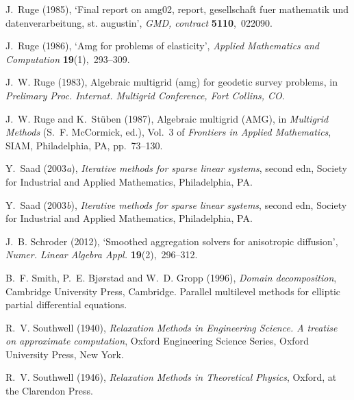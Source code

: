 \documentclass[12pt]{acta_2011xz}
\begin{document}
\begin{thebibliography}{xx}
J.~Ruge  (1985), `Final report on amg02, report, gesellschaft fuer mathematik
  und datenverarbeitung, st. augustin', {\em GMD, contract} {\bf 5110},~022090.

J.~Ruge  (1986), `Amg for problems of elasticity', {\em Applied Mathematics and
  Computation} {\bf 19}(1),~293--309.

J.~W. Ruge  (1983), Algebraic multigrid (amg) for geodetic survey problems, in
  {\em Prelimary Proc. Internat. Multigrid Conference, Fort Collins, CO}.

J.~W. Ruge and K.~St{\"{u}}ben  (1987), Algebraic multigrid ({AMG}), in {\em
  Multigrid Methods} (S.~F. McCormick, ed.), Vol.~3 of {\em Frontiers in
  Applied Mathematics}, SIAM, Philadelphia, PA, pp.~73--130.

Y.~Saad  (2003{\em a}), {\em Iterative methods for sparse linear systems},
  second edn, Society for Industrial and Applied Mathematics, Philadelphia, PA.

Y.~Saad  (2003{\em b}), {\em Iterative methods for sparse linear systems},
  second edn, Society for Industrial and Applied Mathematics, Philadelphia, PA.

J.~B. Schroder  (2012), `Smoothed aggregation solvers for anisotropic
  diffusion', {\em Numer. Linear Algebra Appl.} {\bf 19}(2),~296--312.

B.~F. Smith, P.~E. Bj{\o}rstad and W.~D. Gropp  (1996), {\em Domain
  decomposition}, Cambridge University Press, Cambridge.
\newblock Parallel multilevel methods for elliptic partial differential
  equations.

R.~V. Southwell  (1940), {\em Relaxation {M}ethods in {E}ngineering {S}cience.
  {A} treatise on approximate computation}, Oxford Engineering Science Series,
  Oxford University Press, New York.

R.~V. Southwell  (1946), {\em Relaxation {M}ethods in {T}heoretical {P}hysics},
  Oxford, at the Clarendon Press.


\end{thebibliography}
\end{document}
